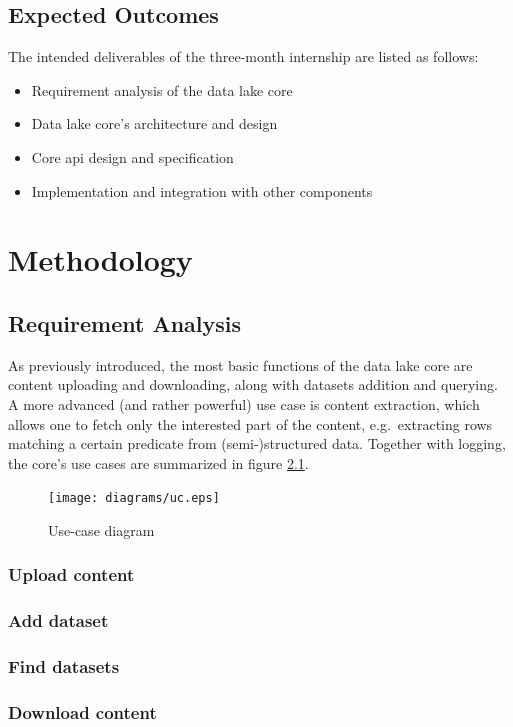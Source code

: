 \documentclass[a4paper,12pt]{book}
\begin{document}
\section{Expected Outcomes}
The intended deliverables of the three-month internship are listed as follows:
\begin{itemize}
  \item Requirement analysis of the data lake core
  \item Data lake core's architecture and design
  \item Core \gls{api} design and specification
  \item Implementation and integration with other components
\end{itemize}

\chapter{Methodology}
\section{Requirement Analysis}
As previously introduced, the most basic functions of the data lake core
are content uploading and downloading, along with datasets addition
and querying.  A more advanced (and rather powerful) use case is
content extraction, which allows one to fetch only the interested part
of the content, e.g.~extracting rows matching a certain predicate
from (semi-)structured data.  Together with logging, the core's use cases
are summarized in figure \ref{uc}.

\begin{figure}
  \texttt{[image: diagrams/uc.eps]}
  \caption{Use-case diagram}
  \label{uc}
\end{figure}

\subsection{Upload content}
\subsection{Add dataset}
\subsection{Find datasets}
\subsection{Download content}
\end{document}
